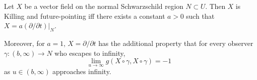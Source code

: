 Let $X$ be a vector field on the normal Schwarzschild region $N \subset U$. Then $X$ is Killing and future-pointing iff there exists a constant $a > 0$ such that $X = a (\partial/\partial t)|_N$.

Moreover, for $a = 1$, $X = \partial/\partial t$ has the additional property that for every observer $\gamma: (b, \infty) \to N$ who escapes to infinity,
$$\lim_{u \to \infty} g(X \circ \gamma, X \circ \gamma) = -1$$
as $u \in (b, \infty)$ approaches infinity.
